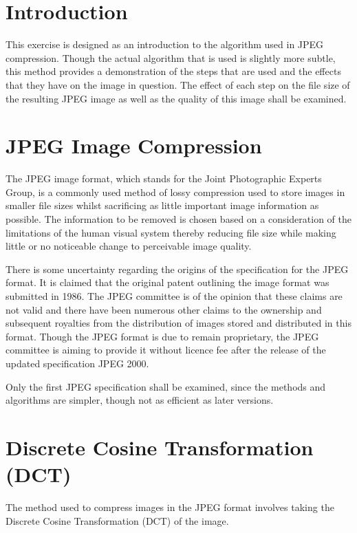 
\section{Introduction} %
\label{sec:introduction}
This exercise is designed as an introduction to the algorithm used in JPEG compression. Though the actual algorithm that is used is slightly more subtle, this method provides a demonstration of the steps that are used and the effects that they have on the image in question. The effect of each step on the file size of the resulting JPEG image as well as the quality of this image shall be examined.

\section{JPEG Image Compression} %
\label{sec:jpeg_image_compression}
The JPEG image format, which stands for the Joint Photographic Experts Group, is a commonly used method of lossy compression used to store images in smaller file sizes whilst sacrificing as little important image information as possible. The information to be removed is chosen based on a consideration of the limitations of the human visual system thereby reducing file size while making little or no noticeable change to perceivable image quality.

There is some uncertainty regarding the origins of the specification for the JPEG format. It is claimed that the original patent outlining the image format was submitted in 1986. The JPEG committee is of the opinion that these claims are not valid and there have been numerous other claims to the ownership and subsequent royalties from the distribution of images stored and distributed in this format. Though the JPEG format is due to remain proprietary, the JPEG committee is aiming to provide it without licence fee after the release of the updated specification JPEG 2000.

Only the first JPEG specification shall be examined, since the methods and algorithms are simpler, though not as efficient as later versions.

\section{Discrete Cosine Transformation (DCT)} %
\label{sec:discrete_cosine_transformation_}
The method used to compress images in the JPEG format involves taking the Discrete Cosine Transformation (DCT) of the image. 

